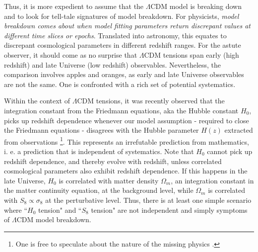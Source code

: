 \documentclass[a4paper,11pt]{article}
\begin{document}
Thus, it is more expedient to assume that the $\Lambda$CDM model is breaking down and to look for tell-tale signatures of model breakdown. For physicists, \textit{model breakdown comes about when model fitting parameters return discrepant values at different time slices or epochs}. Translated into astronomy, this equates to discrepant cosmological parameters in different redshift ranges. For the astute observer, it should come as no surprise that $\Lambda$CDM tensions span early (high redshift) and late Universe (low redshift) observables. Nevertheless, the comparison involves apples and oranges, as early and late Universe observables are not the same. One is confronted with a rich set of potential systematics. 

Within the context of $\Lambda$CDM tensions, it was recently observed that the integration constant from the Friedmann equations, aka the Hubble constant $H_0$, picks up redshift dependence whenever our model assumption - required to close the Friedmann equations - disagrees with the Hubble parameter $H(z)$ extracted from observations \cite{Krishnan:2020vaf, Krishnan:2022fzz} \footnote{One is free to speculate about the nature of the missing physics \cite{Liao:2020zko, Montani:2023xpd}.}. This represents an irrefutable prediction from mathematics, i. e. a prediction that is independent of systematics. Note that $H_0$ cannot pick up redshift dependence, and thereby evolve with redshift, unless correlated cosmological parameters also exhibit redshift dependence. If this happens in the late Universe, $H_0$ is correlated with matter density $\Omega_m$, an integration constant in the matter continuity equation, at the background level, while $\Omega_m$ is correlated with $S_8 \propto \sigma_8$ at the perturbative level. Thus, there is at least one simple scenario where ``$H_0$ tension" and ``$S_8$ tension" are not independent and simply symptoms of $\Lambda$CDM model breakdown. 
\end{document}
